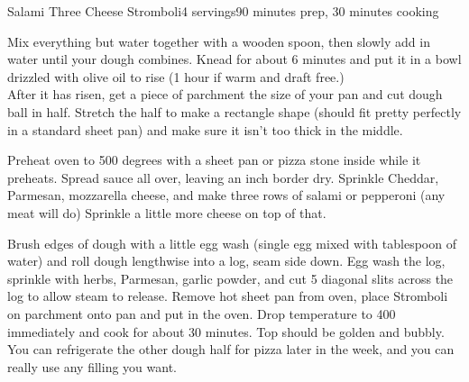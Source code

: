 \documentclass[../Cookbook.tex]{subfiles}
\begin{document}
\begin{recipe}{Salami Three Cheese Stromboli}{4 servings}{90 minutes prep, 30 minutes cooking}

Mix everything but water together with a wooden spoon, then slowly add in water until your dough combines. Knead for about 6 minutes and put it in a bowl drizzled with olive oil to rise (1 hour if warm and draft free.)\\


After it has risen, get a piece of parchment the size of your pan and cut dough ball in half. Stretch the half to make a rectangle shape (should fit pretty perfectly in a standard sheet pan) and make sure it isn't too thick in the middle.

Preheat oven to 500 degrees with a sheet pan or pizza stone inside while it preheats.
Spread sauce all over, leaving an inch border dry. Sprinkle Cheddar, Parmesan, mozzarella cheese, and make three rows of salami or pepperoni (any meat will do) Sprinkle a little more cheese on top of that.

Brush edges of dough with a little egg wash (single egg mixed with tablespoon of water) and roll dough lengthwise into a log, seam side down.
Egg wash the log, sprinkle with herbs, %
Parmesan, garlic powder, and cut 5 diagonal slits across the log to allow steam to release.
Remove hot sheet pan from oven, place Stromboli on parchment onto pan and put in the oven. Drop temperature to 400 immediately and cook for about 30 minutes. Top should be golden and bubbly.
You can refrigerate the other dough half for pizza later in the week, and you can really use any filling you want.

\end{recipe}
\end{document}

